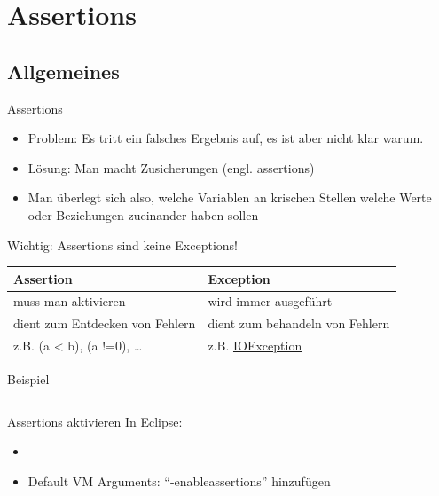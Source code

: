 \documentclass[usepdftitle=false,hyperref={pdfpagelabels=false}]{beamer}
\begin{document}
\section{Assertions}
\subsection{Allgemeines}
\begin{frame}{Assertions}
    \begin{itemize}[<+->]
        \item Problem: Es tritt ein falsches Ergebnis auf, es ist
              aber nicht klar warum.
        \item Lösung: Man macht Zusicherungen (engl. assertions)
        \item Man überlegt sich also, welche Variablen an 
              krischen Stellen welche Werte oder Beziehungen 
              zueinander haben sollen
    \end{itemize}
    \pause[\thebeamerpauses]
    \begin{alertblock}{Wichtig: Assertions sind keine Exceptions!}
        \begin{tabular}{l|l}
            \textbf{Assertion}                  & \textbf{Exception}\\
            \hline
            muss man aktivieren                 & wird immer ausgeführt\\
            dient zum Entdecken von Fehlern     & dient zum behandeln von Fehlern\\
            z.B. (a < b), (a !=0), \dots        & z.B. \href{http://docs.oracle.com/javase/7/docs/api/java/io/IOException.html}{IOException}\\
        \end{tabular}
    \end{alertblock}
\end{frame}

\begin{frame}{Beispiel}
    \inputminted[linenos=false, tabsize=4, fontsize=\small]{java}{singleLines.java}
\end{frame}

\begin{frame}{Assertions aktivieren}
    In Eclipse:
    \begin{itemize}
        \item {}
        \item Default VM Arguments: "`-enableassertions"' hinzufügen
    \end{itemize}
\end{frame}
\end{document}

